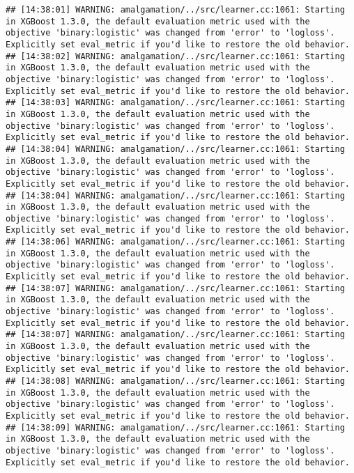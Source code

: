 \documentclass[
]{book}
\begin{document}
\begin{verbatim}
## [14:38:01] WARNING: amalgamation/../src/learner.cc:1061: Starting in XGBoost 1.3.0, the default evaluation metric used with the objective 'binary:logistic' was changed from 'error' to 'logloss'. Explicitly set eval_metric if you'd like to restore the old behavior.
## [14:38:02] WARNING: amalgamation/../src/learner.cc:1061: Starting in XGBoost 1.3.0, the default evaluation metric used with the objective 'binary:logistic' was changed from 'error' to 'logloss'. Explicitly set eval_metric if you'd like to restore the old behavior.
## [14:38:03] WARNING: amalgamation/../src/learner.cc:1061: Starting in XGBoost 1.3.0, the default evaluation metric used with the objective 'binary:logistic' was changed from 'error' to 'logloss'. Explicitly set eval_metric if you'd like to restore the old behavior.
## [14:38:04] WARNING: amalgamation/../src/learner.cc:1061: Starting in XGBoost 1.3.0, the default evaluation metric used with the objective 'binary:logistic' was changed from 'error' to 'logloss'. Explicitly set eval_metric if you'd like to restore the old behavior.
## [14:38:04] WARNING: amalgamation/../src/learner.cc:1061: Starting in XGBoost 1.3.0, the default evaluation metric used with the objective 'binary:logistic' was changed from 'error' to 'logloss'. Explicitly set eval_metric if you'd like to restore the old behavior.
## [14:38:06] WARNING: amalgamation/../src/learner.cc:1061: Starting in XGBoost 1.3.0, the default evaluation metric used with the objective 'binary:logistic' was changed from 'error' to 'logloss'. Explicitly set eval_metric if you'd like to restore the old behavior.
## [14:38:07] WARNING: amalgamation/../src/learner.cc:1061: Starting in XGBoost 1.3.0, the default evaluation metric used with the objective 'binary:logistic' was changed from 'error' to 'logloss'. Explicitly set eval_metric if you'd like to restore the old behavior.
## [14:38:07] WARNING: amalgamation/../src/learner.cc:1061: Starting in XGBoost 1.3.0, the default evaluation metric used with the objective 'binary:logistic' was changed from 'error' to 'logloss'. Explicitly set eval_metric if you'd like to restore the old behavior.
## [14:38:08] WARNING: amalgamation/../src/learner.cc:1061: Starting in XGBoost 1.3.0, the default evaluation metric used with the objective 'binary:logistic' was changed from 'error' to 'logloss'. Explicitly set eval_metric if you'd like to restore the old behavior.
## [14:38:09] WARNING: amalgamation/../src/learner.cc:1061: Starting in XGBoost 1.3.0, the default evaluation metric used with the objective 'binary:logistic' was changed from 'error' to 'logloss'. Explicitly set eval_metric if you'd like to restore the old behavior.

\end{verbatim}
\end{document}

